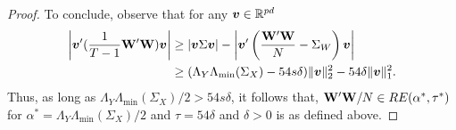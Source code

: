 \begin{proof}
    To conclude, observe that for any $\bm{v}\in\mathbb{R}^{pd}$
    \begin{align*}
        \left|\bm{v}' (\frac{1}{T-1} \mathbf{W}'\mathbf{W})  \bm{v}\right| &\geq  |\bm{v}\Sigma\bm{v}|  - \left|\bm{v}' \left(\frac{\mathbf{W}'\mathbf{W}}{N} - \Sigma_W \right) \bm{v}\right|\\
        &\geq (\Lambda_{Y}\Lambda_{\min}(\Sigma_X) - 54s\delta )\|\bm{v}\|_2^2 - {54\delta}  \|\bm{v}\|_1^2.  
    \end{align*}    
    Thus, as long as $\Lambda_{Y} \Lambda_{\min}(\Sigma_X) /2 > 54s\delta $, it follows that,
    $\mathbf{W}'\mathbf{W}/N \in RE(\alpha^*,\tau^*)$ for $\alpha^* = \Lambda_{Y}\Lambda_{\min}(\Sigma_X) /2$ and $\tau = {54\delta}$ and $\delta > 0$ is as defined above.
\end{proof}





